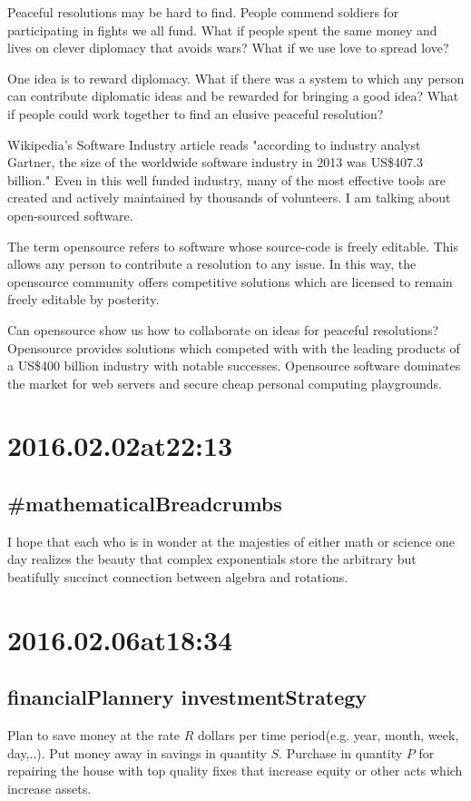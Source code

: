 Peaceful resolutions may be hard to find. People commend soldiers for participating in fights we all fund. What if people spent the same money and lives on clever diplomacy that avoids wars? What if we use love to spread love?

One idea is to reward diplomacy. What if there was a system to which any person can contribute diplomatic ideas and be rewarded for bringing a good idea? What if people could work together to find an elusive peaceful resolution?

Wikipedia's Software Industry article reads "according to industry analyst Gartner, the size of the worldwide software industry in 2013 was US\$407.3 billion." Even in this well funded industry, many of the most effective tools are created and actively maintained by thousands of volunteers. I am talking about open-sourced software.

The term opensource refers to software whose source-code is freely editable. This allows any person to contribute a resolution to any issue. In this way, the opensource community offers competitive solutions which are licensed to remain freely editable by posterity.

Can opensource show us how to collaborate on ideas for peaceful resolutions? Opensource provides solutions which competed with with the leading products of a US\$400 billion industry with notable successes. Opensource software dominates the market for web servers and secure cheap personal computing playgrounds.

\section*{ 2016.02.02at22:13 }
\subsection*{ #mathematicalBreadcrumbs }
I hope that each who is in wonder at the majesties of either math or science one day realizes the beauty that complex exponentials store the arbitrary but beatifully succinct connection between algebra and rotations.

\section*{ 2016.02.06at18:34 }
\subsection*{ financialPlannery investmentStrategy }
Plan to save money at the rate $R$ dollars per time period(e.g. year, month, week, day,..). Put money away in savings in quantity $S$. Purchase in quantity $P$ for repairing the house with top quality fixes that increase equity or other acts which increase assets.

